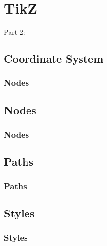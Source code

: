 
{
\renewcommand{\bgcolor}{tikz}

\section{TikZ}
\begin{frame}
  \vspace{25mm}
  \begin{center}
    \Huge{Part 2:\\\TikZ}
  \end{center}
\end{frame}

\subsection{Coordinate System}
\begin{frame}[fragile]
  \frametitle{Nodes}
  \vspace{3mm}
  
\end{frame}

\subsection{Nodes}
\begin{frame}[fragile]
  \frametitle{Nodes}
  \vspace{3mm}
  
\end{frame}

\subsection{Paths}
\begin{frame}[fragile]
  \frametitle{Paths}
  \vspace{3mm}
  
\end{frame}

\subsection{Styles}
\begin{frame}[fragile]
  \frametitle{Styles}
  \vspace{3mm}
  
\end{frame}

}
